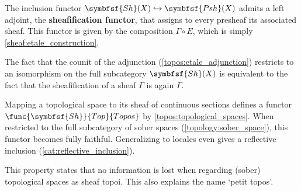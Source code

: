     \begin{property}
        The inclusion functor $\symbfsf{Sh}(X)\hookrightarrow\symbfsf{Psh}(X)$ admits a left adjoint, the \textbf{sheafification functor}, that assigns to every presheaf its associated sheaf. This functor is given by the composition $\Gamma\circ E$, which is simply \cref{sheaf:etale_construction}.

        The fact that the counit of the adjunction (\cref{topos:etale_adjunction}) restricts to an isomorphism on the full subcategory $\symbfsf{Sh}(X)$ is equivalent to the fact that the sheafification of a sheaf $\Gamma$ is again $\Gamma$.
    \end{property}


    \begin{property}
        Mapping a topological space to its sheaf of continuous sections defines a functor $\func{\symbfsf{Sh}}{Top}{Topos}$ by \cref{topos:topological_spaces}. When restricted to the full subcategory of sober spaces (\cref{topology:sober_space}), this functor becomes fully faithful. Generalizing to locales even gives a reflective inclusion (\cref{cat:reflective_inclusion}).

        This property states that no information is lost when regarding (sober) topological spaces as sheaf topoi. This also explains the name `petit topos'.
    \end{property}

